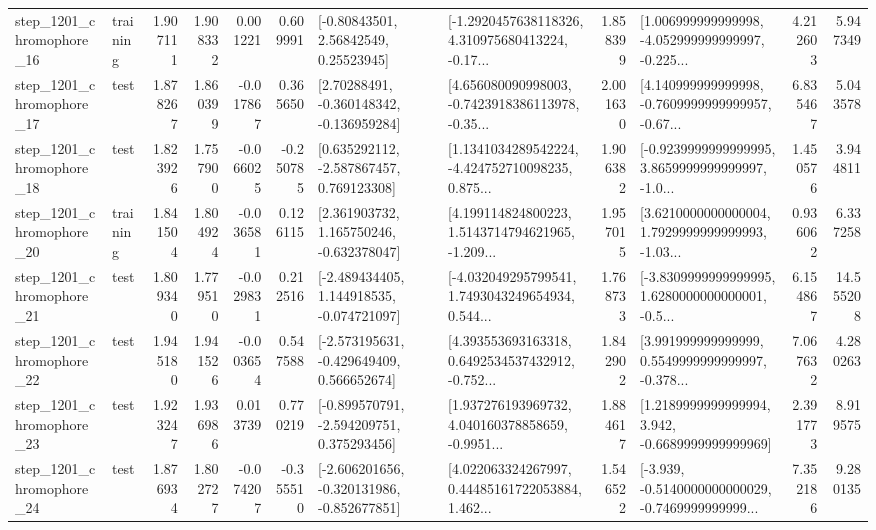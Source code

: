 \begin{tabular}{llrrrrllrlrr}
 step\_1201\_chromophore\_16 &  training &      1.907111 &    1.908332 &      0.001221 &  0.609991 &       [-0.80843501, 2.56842549, 0.25523945] &  [-1.2920457638118326, 4.310975680413224, -0.17... &       1.858399 &  [1.006999999999998, -4.052999999999997, -0.225... &            4.212603 &          5.947349 \\
 step\_1201\_chromophore\_17 &      test &      1.878267 &    1.860399 &     -0.017867 &  0.365650 &    [2.70288491, -0.360148342, -0.136959284] &  [4.656080090998003, -0.7423918386113978, -0.35... &       2.001630 &  [4.140999999999998, -0.7609999999999957, -0.67... &            6.835467 &          5.043578 \\
 step\_1201\_chromophore\_18 &      test &      1.823926 &    1.757900 &     -0.066025 & -0.250785 &    [0.635292112, -2.587867457, 0.769123308] &  [1.1341034289542224, -4.424752710098235, 0.875... &       1.906382 &  [-0.9239999999999995, 3.8659999999999997, -1.0... &            1.450576 &          3.944811 \\
 step\_1201\_chromophore\_20 &  training &      1.841504 &    1.804924 &     -0.036581 &  0.126115 &    [2.361903732, 1.165750246, -0.632378047] &  [4.199114824800223, 1.5143714794621965, -1.209... &       1.957015 &  [3.6210000000000004, 1.7929999999999993, -1.03... &            0.936062 &          6.337258 \\
 step\_1201\_chromophore\_21 &      test &      1.809340 &    1.779510 &     -0.029831 &  0.212516 &   [-2.489434405, 1.144918535, -0.074721097] &  [-4.032049295799541, 1.7493043249654934, 0.544... &       1.768733 &  [-3.8309999999999995, 1.6280000000000001, -0.5... &            6.154867 &         14.555208 \\
 step\_1201\_chromophore\_22 &      test &      1.945180 &    1.941526 &     -0.003654 &  0.547588 &   [-2.573195631, -0.429649409, 0.566652674] &  [4.393553693163318, 0.6492534537432912, -0.752... &       1.842902 &  [3.991999999999999, 0.5549999999999997, -0.378... &            7.067632 &          4.280263 \\
 step\_1201\_chromophore\_23 &      test &      1.923247 &    1.936986 &      0.013739 &  0.770219 &   [-0.899570791, -2.594209751, 0.375293456] &  [1.937276193969732, 4.040160378858659, -0.9951... &       1.884617 &   [1.2189999999999994, 3.942, -0.6689999999999969] &            2.391773 &          8.919575 \\
 step\_1201\_chromophore\_24 &      test &      1.876934 &    1.802727 &     -0.074207 & -0.355510 &  [-2.606201656, -0.320131986, -0.852677851] &  [4.022063324267997, 0.44485161722053884, 1.462... &       1.546522 &  [-3.939, -0.5140000000000029, -0.7469999999999... &            7.352186 &          9.280135 \\

\end{tabular}
